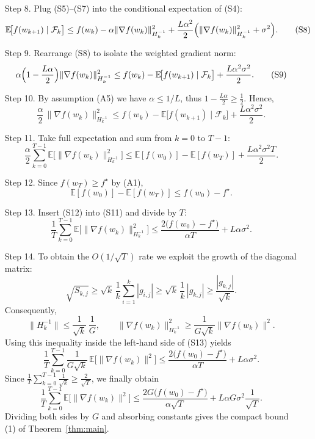 \documentclass{article}
\begin{document}
\begin{enumerate}
\item[Step 8.] Plug (S5)–(S7) into the conditional expectation of (S4):
\[
\mathbb{E}\!\bigl[f(w_{k+1})\mid\mathcal{F}_{k}\bigr]
\le f(w_{k})
 -\alpha\|\nabla f(w_{k})\|^{2}_{H_{k}^{-1}}
 +\frac{L\alpha^{2}}{2}
   \Bigl(\|\nabla f(w_{k})\|^{2}_{H_{k}^{-1}}+\sigma^{2}\Bigr).
\tag{S8}
\]

\item[Step 9.] Rearrange (S8) to isolate the weighted gradient norm:
\[
\alpha\Bigl(1-\frac{L\alpha}{2}\Bigr)\|\nabla f(w_{k})\|^{2}_{H_{k}^{-1}}
\le f(w_{k})-\mathbb{E}\!\bigl[f(w_{k+1})\mid\mathcal{F}_{k}\bigr]
      +\frac{L\alpha^{2}\sigma^{2}}{2}.
\tag{S9}
\]

\item[Step 10.] By assumption (A5) we have $\alpha\le 1/L$, thus $1-\frac{L\alpha}{2}\ge\frac{1}{2}$.
Hence,
\[
\frac{\alpha}{2}\,\|\nabla f(w_{k})\|^{2}_{H_{k}^{-1}}
\le f(w_{k})-\mathbb{E}\!\bigl[f(w_{k+1})\mid\mathcal{F}_{k}\bigr]
      +\frac{L\alpha^{2}\sigma^{2}}{2}.
\tag{S10}
\]

\item[Step 11.] Take full expectation and sum from $k=0$ to $T-1$:
\[
\frac{\alpha}{2}\sum_{k=0}^{T-1}
\mathbb{E}\!\bigl[\|\nabla f(w_{k})\|^{2}_{H_{k}^{-1}}\bigr]
\le \mathbb{E}[f(w_{0})]-\mathbb{E}[f(w_{T})]
    +\frac{L\alpha^{2}\sigma^{2}T}{2}.
\tag{S11}
\]

\item[Step 12.] Since $f(w_{T})\ge f^{\star}$ by (A1),
\[
\mathbb{E}[f(w_{0})]-\mathbb{E}[f(w_{T})]\le f(w_{0})-f^{\star}.
\tag{S12}
\]

\item[Step 13.] Insert (S12) into (S11) and divide by $T$:
\[
\frac{1}{T}\sum_{k=0}^{T-1}
\mathbb{E}\!\bigl[\|\nabla f(w_{k})\|^{2}_{H_{k}^{-1}}\bigr]
\le
\frac{2\bigl(f(w_{0})-f^{\star}\bigr)}{\alpha T}
   +L\alpha\sigma^{2}.
\tag{S13}
\]

\item[Step 14.] To obtain the $O(1/\sqrt{T})$ rate we exploit the growth of the diagonal matrix:
\[
\sqrt{S_{k,j}} \ge \sqrt{k}\, \frac{1}{k}\sum_{i=1}^{k}|g_{i,j}|
          \ge \sqrt{k}\,\frac{1}{k}\,|g_{k,j}|
          \ge \frac{|g_{k,j}|}{\sqrt{k}}.
\]
Consequently,
\[
\|H_{k}^{-1}\| \le \frac{1}{\sqrt{k}}\,\frac{1}{G},
\qquad
\|\nabla f(w_{k})\|^{2}_{H_{k}^{-1}}
\ge \frac{1}{G\sqrt{k}}\|\nabla f(w_{k})\|^{2}.
\]
Using this inequality inside the left‑hand side of (S13) yields
\[
\frac{1}{T}\sum_{k=0}^{T-1}
\frac{1}{G\sqrt{k}}\,
\mathbb{E}\!\bigl[\|\nabla f(w_{k})\|^{2}\bigr]
\le
\frac{2\bigl(f(w_{0})-f^{\star}\bigr)}{\alpha T}
   +L\alpha\sigma^{2}.
\]
Since $\frac{1}{T}\sum_{k=0}^{T-1}\frac{1}{\sqrt{k}}\ge \frac{2}{\sqrt{T}}$,
we finally obtain
\[
\frac{1}{T}\sum_{k=0}^{T-1}
\mathbb{E}\!\bigl[\|\nabla f(w_{k})\|^{2}\bigr]
\le
\frac{2G\bigl(f(w_{0})-f^{\star}\bigr)}{\alpha\sqrt{T}}
   +L\alpha G\sigma^{2}\frac{1}{\sqrt{T}} .
\]
Dividing both sides by $G$ and absorbing constants gives the compact bound (1) of Theorem~\ref{thm:main}.
\end{enumerate}
\end{document}
